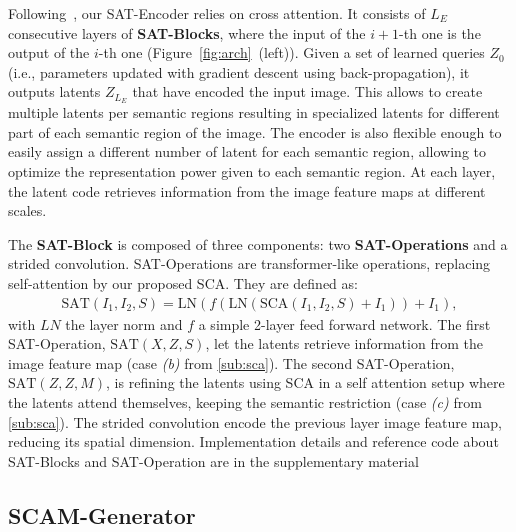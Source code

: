 \documentclass[runningheads]{llncs}
\makeatletter
\newcommand{\ie}{i.e.\@\xspace}
\makeatother
\begin{document}
Following~\cite{jaegle2021perceiver}, our SAT-Encoder relies on cross attention. 
It consists of $L_{E}$ consecutive layers of \textbf{SAT-Blocks}, where the input of the $i{+}1$-th one is the output of the $i$-th one 
(Figure~\ref{fig:arch}~(left)). Given a set of learned queries $Z_0$ (\ie, parameters updated with gradient descent using back-propagation), it 
outputs latents $Z_{L_{E}}$ that have encoded the input image. 
This allows to create multiple latents per semantic regions resulting in specialized latents for different part of each semantic region of the image. The encoder is also flexible enough to easily assign a different number of latent for each semantic region, allowing to optimize the representation power given to each semantic region. At each layer, the latent code retrieves information from the image feature maps at different scales.



\noindent The \textbf{SAT-Block} is composed of three components: two \textbf{SAT-Operations} and a strided convolution. SAT-Operations are transformer-like \cite{vaswani2017attention} operations, replacing self-attention by our proposed SCA. They are defined as:
\begin{align}
\text{SAT}(I_1, I_2, S) = \text{LN}( f( \text{LN}(\text{SCA}(I_1, I_2, S) + I_1)) + I_1),
\end{align}
with $LN$ the layer norm and $f$ a simple 2-layer feed forward network.
The first SAT-Operation, $\text{SAT}(X, Z, S)$, let the latents retrieve information from the image feature map (case \emph{(b)} from \ref{sub:sca}). The second SAT-Operation, $\text{SAT}(Z, Z, M)$, is refining the latents using SCA in a self attention setup where the latents attend themselves, keeping the semantic restriction (case \emph{(c)} from \ref{sub:sca}). The strided convolution encode the previous layer image feature map, reducing its spatial dimension. Implementation details and reference code about SAT-Blocks and SAT-Operation are in the supplementary material



 














 
\subsection{SCAM-Generator}
\label{sub:scam}
\end{document}
